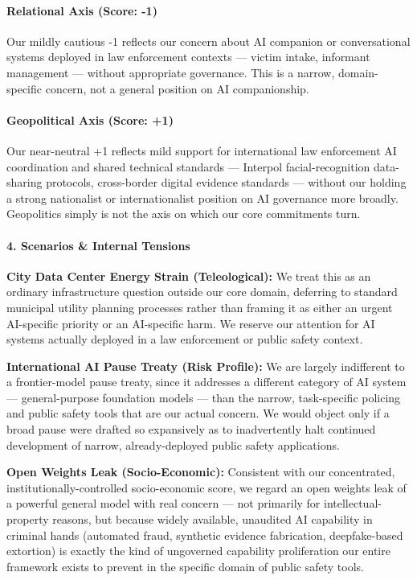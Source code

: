 \paragraph{Relational Axis (Score:
-1)}\label{relational-axis-score--1-3}

Our mildly cautious -1 reflects our concern about AI companion or
conversational systems deployed in law enforcement contexts --- victim
intake, informant management --- without appropriate governance. This is
a narrow, domain-specific concern, not a general position on AI
companionship.

\paragraph{Geopolitical Axis (Score:
+1)}\label{geopolitical-axis-score-1-1}

Our near-neutral +1 reflects mild support for international law
enforcement AI coordination and shared technical standards --- Interpol
facial-recognition data-sharing protocols, cross-border digital evidence
standards --- without our holding a strong nationalist or
internationalist position on AI governance more broadly. Geopolitics
simply is not the axis on which our core commitments turn.

\paragraph{4. Scenarios \& Internal
Tensions}\label{scenarios-internal-tensions-26}

\textbf{City Data Center Energy Strain (Teleological):} We treat this as
an ordinary infrastructure question outside our core domain, deferring
to standard municipal utility planning processes rather than framing it
as either an urgent AI-specific priority or an AI-specific harm. We
reserve our attention for AI systems actually deployed in a law
enforcement or public safety context.

\textbf{International AI Pause Treaty (Risk Profile):} We are largely
indifferent to a frontier-model pause treaty, since it addresses a
different category of AI system --- general-purpose foundation models
--- than the narrow, task-specific policing and public safety tools that
are our actual concern. We would object only if a broad pause were
drafted so expansively as to inadvertently halt continued development of
narrow, already-deployed public safety applications.

\textbf{Open Weights Leak (Socio-Economic):} Consistent with our
concentrated, institutionally-controlled socio-economic score, we regard
an open weights leak of a powerful general model with real concern ---
not primarily for intellectual-property reasons, but because widely
available, unaudited AI capability in criminal hands (automated fraud,
synthetic evidence fabrication, deepfake-based extortion) is exactly the
kind of ungoverned capability proliferation our entire framework exists
to prevent in the specific domain of public safety tools.

